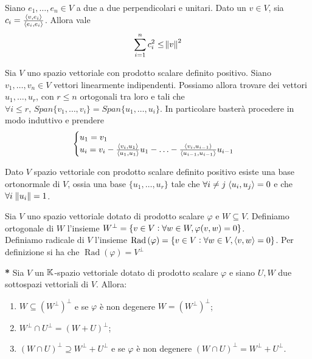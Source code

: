 \begin{thm}
	Siano $ e_1, \ldots , e_n \in V $ a due a due perpendicolari e unitari. Dato un $ v \in V $, sia $ c_i = \frac{\langle v, e_i \rangle}{\langle e_i, e_i \rangle} $. Allora vale \[\sum_{i = 1}^{n}c_i^2 \leq \norm{v}^2\]
\end{thm}

\begin{thm}
	Sia $ V $ uno spazio vettoriale con prodotto scalare definito positivo. Siano $ v_1, \ldots , v_n \in V $ vettori linearmente indipendenti. Possiamo allora trovare dei vettori $ u_1,\ldots, u_r $, con $ r \leq n $ ortogonali tra loro e tali che $ \forall i \leq r, \, Span\{v_1, \ldots, v_i\} = Span \{u_1, \ldots, u_i\} $. In particolare basterà procedere in modo induttivo e prendere
	\[\begin{cases}
	u_1 = v_1 \\
	u_{i} = v_i - \frac{\langle v_i, u_1 \rangle}{\langle u_1, u_1 \rangle}u_1 - \ldots - \frac{\langle v_i, u_{i-1} \rangle}{\langle u_{i-1}, u_{i-1} \rangle}u_{i-1}
	\end{cases}\]
\end{thm}

\begin{corollary}
	Dato $ V $ spazio vettoriale con prodotto scalare definito positivo esiste una base ortonormale di $ V $, ossia una base $ \{u_1,\ldots, u_r\} $ tale che $ \forall i \neq j \; \langle u_i, u_j \rangle = 0 $ e che $ \forall i \; \norm{u_i} = 1 $.
\end{corollary}

\begin{definition}
	Sia $ V $ uno spazio vettoriale dotato di prodotto scalare $ \varphi $ e $ W \subseteq V $. Definiamo ortogonale di $ W $ l'insieme $ W^{\perp} = \{v \in V : \forall w \in W, \varphi{\left(v, w\right)} = 0\} $.\\
	Definiamo radicale di $ V $ l'insieme $ \operatorname{Rad}{(\varphi)} = \{v \in V : \forall w \in V, \langle v, w \rangle = 0\} $. Per definizione si ha che $ \operatorname{Rad}{(\varphi)} = V^{\perp} $
\end{definition}

\begin{propriety} \textbf{*}
	Sia $ V $ un $ \mathbb{K} $-spazio vettoriale dotato di prodotto scalare $ \varphi $ e siano $ U, W $ due sottospazi vettoriali di $ V $. Allora:
	\begin{enumerate}[label = (\roman*)]
		\item $ W \subseteq (W^{\perp})^{\perp} $ e se $ \varphi $ è non degenere $ W = (W^{\perp})^{\perp} $;
		\item $ W^{\perp} \cap U^{\perp} = (W + U)^{\perp} $;
		\item $ (W \cap U)^{\perp} \supseteq W^{\perp} + U^{\perp} $ e se $ \varphi $ è non degenere $ (W \cap U)^{\perp} = W^{\perp} + U^{\perp} $.
	\end{enumerate}
\end{propriety}


